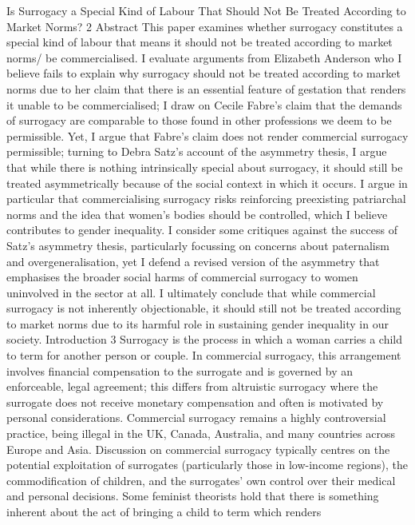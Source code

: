 Is Surrogacy a Special Kind of Labour That Should Not Be Treated
According to Market Norms? 2 Abstract This paper examines whether
surrogacy constitutes a special kind of labour that means it should not
be treated according to market norms/ be commercialised. I evaluate
arguments from Elizabeth Anderson who I believe fails to explain why
surrogacy should not be treated according to market norms due to her
claim that there is an essential feature of gestation that renders it
unable to be commercialised; I draw on Cecile Fabre's claim that the
demands of surrogacy are comparable to those found in other professions
we deem to be permissible. Yet, I argue that Fabre's claim does not
render commercial surrogacy permissible; turning to Debra Satz's account
of the asymmetry thesis, I argue that while there is nothing
intrinsically special about surrogacy, it should still be treated
asymmetrically because of the social context in which it occurs. I argue
in particular that commercialising surrogacy risks reinforcing
preexisting patriarchal norms and the idea that women's bodies should be
controlled, which I believe contributes to gender inequality. I consider
some critiques against the success of Satz's asymmetry thesis,
particularly focussing on concerns about paternalism and
overgeneralisation, yet I defend a revised version of the asymmetry that
emphasises the broader social harms of commercial surrogacy to women
uninvolved in the sector at all. I ultimately conclude that while
commercial surrogacy is not inherently objectionable, it should still
not be treated according to market norms due to its harmful role in
sustaining gender inequality in our society. Introduction 3 Surrogacy is
the process in which a woman carries a child to term for another person
or couple. In commercial surrogacy, this arrangement involves financial
compensation to the surrogate and is governed by an enforceable, legal
agreement; this differs from altruistic surrogacy where the surrogate
does not receive monetary compensation and often is motivated by
personal considerations. Commercial surrogacy remains a highly
controversial practice, being illegal in the UK, Canada, Australia, and
many countries across Europe and Asia. Discussion on commercial
surrogacy typically centres on the potential exploitation of surrogates
(particularly those in low-income regions), the commodification of
children, and the surrogates' own control over their medical and
personal decisions. Some feminist theorists hold that there is something
inherent about the act of bringing a child to term which renders
